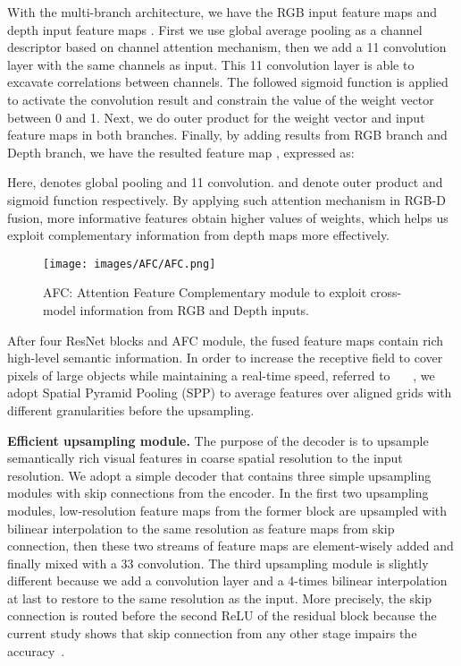 \documentclass[letterpaper, 10 pt, journal, twoside]{ieeetran}
\begin{document}
With the multi-branch architecture, we have the RGB input feature maps  and depth input feature maps . First we use global average pooling as a channel descriptor based on channel attention mechanism, then we add a 11 convolution layer with the same channels as input. This 11 convolution layer is able to excavate correlations between channels. The followed sigmoid function is applied to activate the convolution result and constrain the value of the weight vector between 0 and 1. Next, we do outer product for the weight vector and input feature maps in both branches. Finally, by adding results from RGB branch and Depth branch, we have the resulted feature map , expressed as:





Here,  denotes global pooling and 11 convolution.  and  denote outer product and sigmoid function respectively. By applying such attention mechanism in RGB-D fusion, more informative features obtain higher values of weights, which helps us exploit complementary information from depth maps more effectively.


\begin{figure}[t]
    \centerline{\texttt{[image: images/AFC/AFC.png]}}
    \caption{AFC: Attention Feature Complementary module to exploit cross-model information from RGB and Depth inputs.}
    \label{fig:AFC}
\end{figure}



After four ResNet blocks and AFC module, the fused feature maps contain rich high-level semantic information. In order to increase the receptive field to cover pixels of large objects while maintaining a real-time speed, referred to ~\cite{orsic2019defense}~\cite{ERF-PSPNet}~\cite{zhao2017pyramid}, we adopt Spatial Pyramid Pooling (SPP) to average features over aligned grids with different granularities before the upsampling.


\textbf{Efficient upsampling module.}
The purpose of the decoder is to upsample semantically rich visual features in coarse spatial resolution to the input resolution. We adopt a simple decoder that contains three simple upsampling modules with skip connections from the encoder. In the first two upsampling modules, low-resolution feature maps from the former block are upsampled with bilinear interpolation to the same resolution as feature maps from skip connection, then these two streams of feature maps are element-wisely added and finally mixed with a 33 convolution. The third upsampling module is slightly different because we add a convolution layer and a 4-times bilinear interpolation at last to restore to the same resolution as the input. More precisely, the skip connection is routed before the second ReLU of the residual block because the current study shows that skip connection from any other stage impairs the accuracy~\cite{orsic2019defense}. 
\end{document}
